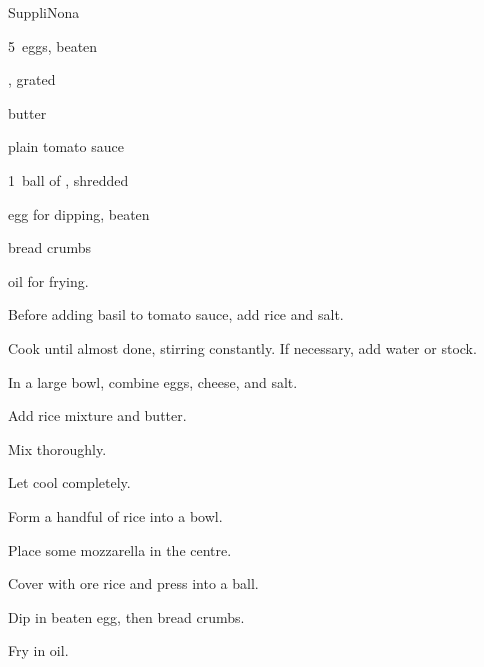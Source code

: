 \begin{recipe}{Suppli}{Nona}{}

\begin{ingredients}
\item {} 
\item 5~eggs, beaten
\item {}, grated
\item \C{\quarter} butter
\item plain tomato sauce
\item 1~ball of , shredded
\item egg for dipping, beaten
\item bread crumbs
\item oil for frying.
\end{ingredients}

\begin{directions}
\item Before adding basil to tomato sauce, add rice and salt.
\item Cook until almost done, stirring constantly. If necessary, add water or stock.
\item In a large bowl, combine eggs, cheese, and salt.
\item Add rice mixture and butter.
\item Mix thoroughly.
\item Let cool completely.
\item Form a handful of rice into a bowl.
\item Place some mozzarella in the centre.
\item Cover with ore rice and press into a ball.
\item Dip in beaten egg, then bread crumbs.
\item Fry in oil.
\end{directions}

\end{recipe}
